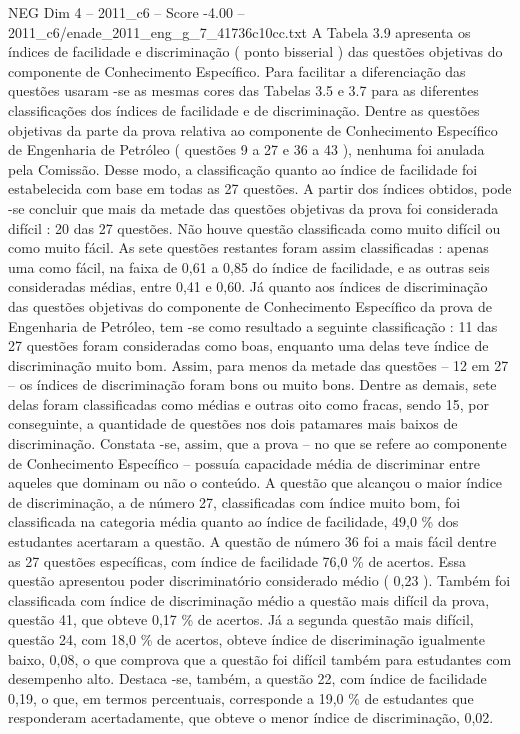 \begin{textsample}{NEG Dim 4 – 2011\_c6 – Score -4.00 – 2011\_c6/enade\_2011\_eng\_g\_7\_41736c10cc.txt}
A Tabela 3.9 apresenta os índices de facilidade e discriminação ( ponto bisserial ) das questões objetivas do componente de Conhecimento Específico.
Para facilitar a diferenciação das questões usaram -se as mesmas cores das Tabelas 3.5 e 3.7 para as diferentes classificações dos índices de facilidade e de discriminação.
Dentre as questões objetivas da parte da prova relativa ao componente de Conhecimento Específico de Engenharia de Petróleo ( questões 9 a 27 e 36 a 43 ), nenhuma foi anulada pela Comissão.
Desse modo, a classificação quanto ao índice de facilidade foi estabelecida com base em todas as 27 questões.
A partir dos índices obtidos, pode -se concluir que mais da metade das questões objetivas da prova foi considerada difícil : 20 das 27 questões.
Não houve questão classificada como muito difícil ou como muito fácil.
As sete questões restantes foram assim classificadas : apenas uma como fácil, na faixa de 0,61 a 0,85 do índice de facilidade, e as outras seis consideradas médias, entre 0,41 e 0,60.
Já quanto aos índices de discriminação das questões objetivas do componente de Conhecimento Específico da prova de Engenharia de Petróleo, tem -se como resultado a seguinte classificação : 11 das 27 questões foram consideradas como boas, enquanto uma delas teve índice de discriminação muito bom.
Assim, para menos da metade das questões – 12 em 27 – os índices de discriminação foram bons ou muito bons.
Dentre as demais, sete delas foram classificadas como médias e outras oito como fracas, sendo 15, por conseguinte, a quantidade de questões nos dois patamares mais baixos de discriminação.
Constata -se, assim, que a prova – no que se refere ao componente de Conhecimento Específico – possuía capacidade média de discriminar entre aqueles que dominam ou não o conteúdo.
A questão que alcançou o maior índice de discriminação, a de número 27, classificadas com índice muito bom, foi classificada na categoria média quanto ao índice de facilidade, 49,0 \% dos estudantes acertaram a questão.
A questão de número 36 foi a mais fácil dentre as 27 questões específicas, com índice de facilidade 76,0 \% de acertos.
Essa questão apresentou poder discriminatório considerado médio ( 0,23 ).
Também foi classificada com índice de discriminação médio a questão mais difícil da prova, questão 41, que obteve 0,17 \% de acertos.
Já a segunda questão mais difícil, questão 24, com 18,0 \% de acertos, obteve índice de discriminação igualmente baixo, 0,08, o que comprova que a questão foi difícil também para estudantes com desempenho alto.
Destaca -se, também, a questão 22, com índice de facilidade 0,19, o que, em termos percentuais, corresponde a 19,0 \% de estudantes que responderam acertadamente, que obteve o menor índice de discriminação, 0,02.

\end{textsample}
